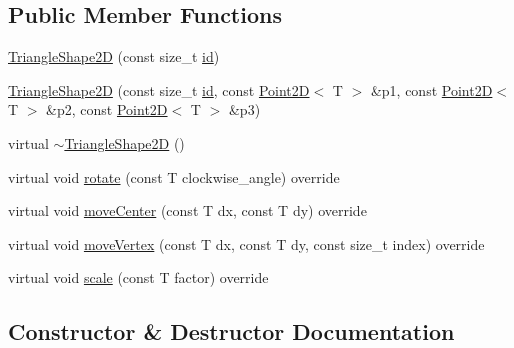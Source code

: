\subsection*{Public Member Functions}
\begin{DoxyCompactItemize}
\item 
\hyperlink{classGraphicalEditorCore_1_1TriangleShape2D_af0339a667c63abd464603bf68e8d4770}{Triangle\+Shape2D} (const size\+\_\+t \hyperlink{classGraphicalEditorCore_1_1BaseShape2D_ac66cfa23289ae36d70ff6b7c41dd791f}{id})
\item 
\hyperlink{classGraphicalEditorCore_1_1TriangleShape2D_a8769846974cfce9f252ba9c1915ecc17}{Triangle\+Shape2D} (const size\+\_\+t \hyperlink{classGraphicalEditorCore_1_1BaseShape2D_ac66cfa23289ae36d70ff6b7c41dd791f}{id}, const \hyperlink{classGraphicalEditorCore_1_1Point2D}{Point2D}$<$ T $>$ \&p1, const \hyperlink{classGraphicalEditorCore_1_1Point2D}{Point2D}$<$ T $>$ \&p2, const \hyperlink{classGraphicalEditorCore_1_1Point2D}{Point2D}$<$ T $>$ \&p3)
\item 
virtual \hyperlink{classGraphicalEditorCore_1_1TriangleShape2D_a561fbaff5077e2d945eb8a9a95c48617}{$\sim$\+Triangle\+Shape2D} ()
\item 
virtual void \hyperlink{classGraphicalEditorCore_1_1TriangleShape2D_a70baf8d77cdaa6107cac5ba2c8f9bc5b}{rotate} (const T clockwise\+\_\+angle) override
\item 
virtual void \hyperlink{classGraphicalEditorCore_1_1TriangleShape2D_a2b84784e80b932ef32641e7ac7d41bee}{move\+Center} (const T dx, const T dy) override
\item 
virtual void \hyperlink{classGraphicalEditorCore_1_1TriangleShape2D_a904d1d62d033013b636062c38df68d29}{move\+Vertex} (const T dx, const T dy, const size\+\_\+t index) override
\item 
virtual void \hyperlink{classGraphicalEditorCore_1_1TriangleShape2D_a769d7053c7410e288abeaa8e6122ee26}{scale} (const T factor) override
\end{DoxyCompactItemize}


\subsection{Constructor \& Destructor Documentation}
